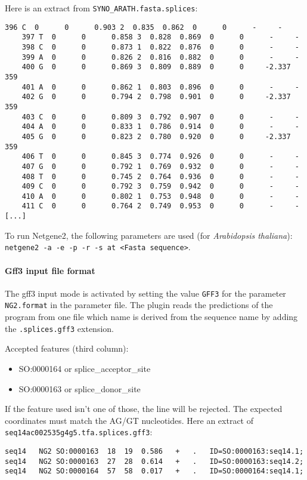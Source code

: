 Here is an extract from \texttt{SYNO\_ARATH.fasta.splices}:
\begin{Verbatim}[fontsize=\small]
    396 C  0      0      0.903 2  0.835  0.862  0      0      -     - 
    397 T  0      0      0.858 3  0.828  0.869  0      0      -     - 
    398 C  0      0      0.873 1  0.822  0.876  0      0      -     - 
    399 A  0      0      0.826 2  0.816  0.882  0      0      -     - 
    400 G  0      0      0.869 3  0.809  0.889  0      0     -2.337 359 
    401 A  0      0      0.862 1  0.803  0.896  0      0      -     - 
    402 G  0      0      0.794 2  0.798  0.901  0      0     -2.337 359 
    403 C  0      0      0.809 3  0.792  0.907  0      0      -     - 
    404 A  0      0      0.833 1  0.786  0.914  0      0      -     - 
    405 G  0      0      0.823 2  0.780  0.920  0      0     -2.337 359 
    406 T  0      0      0.845 3  0.774  0.926  0      0      -     - 
    407 G  0      0      0.792 1  0.769  0.932  0      0      -     - 
    408 T  0      0      0.745 2  0.764  0.936  0      0      -     - 
    409 C  0      0      0.792 3  0.759  0.942  0      0      -     - 
    410 A  0      0      0.802 1  0.753  0.948  0      0      -     - 
    411 C  0      0      0.764 2  0.749  0.953  0      0      -     - 
[...]
\end{Verbatim}

To run Netgene2, the following parameters are used (for \emph{Arabidopsis
thaliana}): \texttt{netgene2 -a -e -p -r -s at <Fasta sequence>}.

\paragraph{Gff3 input file format}

The gff3 input mode is activated by setting the value \texttt{GFF3}
for the parameter \texttt{NG2.format} in the parameter file.  The
plugin reads the predictions of the program from one file which name
is derived from the sequence name by adding the
\texttt{.splices.gff3} extension.

Accepted features (third column):\\
\begin{itemize}
\item  SO:0000164 or splice\_acceptor\_site 
\item  SO:0000163 or splice\_donor\_site 
\end{itemize}
If the feature used isn't one of those, the line will be rejected. The
expected coordinates must match the AG/GT nucleotides.  Here
an extract of \texttt{seq14ac002535g4g5.tfa.splices.gff3}:
\begin{Verbatim}[fontsize=\tiny]
seq14	NG2	SO:0000163	18	19	0.586	+	.	ID=SO:0000163:seq14.1;
seq14	NG2	SO:0000163	27	28	0.614	+	.	ID=SO:0000163:seq14.2;
seq14	NG2	SO:0000164	57	58	0.017	+	.	ID=SO:0000164:seq14.1;
\end{Verbatim}

